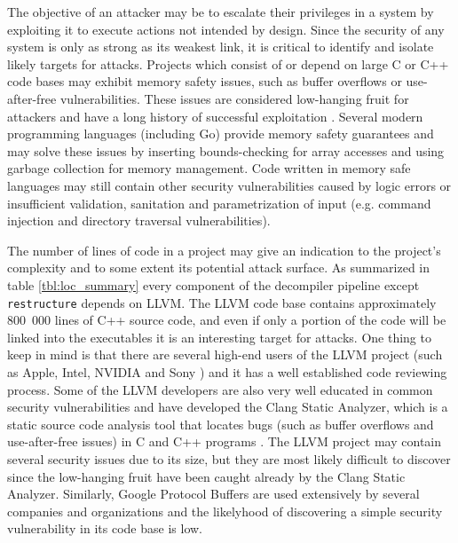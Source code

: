 The objective of an attacker may be to escalate their privileges in a system by exploiting it to execute actions not intended by design. Since the security of any system is only as strong as its weakest link, it is critical to identify and isolate likely targets for attacks. Projects which consist of or depend on large C or C++ code bases may exhibit memory safety issues, such as buffer overflows or use-after-free vulnerabilities. These issues are considered low-hanging fruit for attackers and have a long history of successful exploitation \cite{for_fun_and_profit}. Several modern programming languages (including Go) provide memory safety guarantees and may solve these issues by inserting bounds-checking for array accesses and using garbage collection for memory management. Code written in memory safe languages may still contain other security vulnerabilities caused by logic errors or insufficient validation, sanitation and parametrization of input (e.g. command injection and directory traversal vulnerabilities).

The number of lines of code in a project may give an indication to the project's complexity and to some extent its potential attack surface. As summarized in table \ref{tbl:loc_summary} every component of the decompiler pipeline except \texttt{restructure} depends on LLVM. The LLVM code base contains approximately 800~000 lines of C++ source code, and even if only a portion of the code will be linked into the executables it is an interesting target for attacks. One thing to keep in mind is that there are several high-end users of the LLVM project (such as Apple, Intel, NVIDIA and Sony \cite{llvm_users}) and it has a well established code reviewing process. Some of the LLVM developers are also very well educated in common security vulnerabilities and have developed the Clang Static Analyzer, which is a static source code analysis tool that locates bugs (such as buffer overflows and use-after-free issues) in C and C++ programs \cite{clang_analyzer}. The LLVM project may contain several security issues due to its size, but they are most likely difficult to discover since the low-hanging fruit have been caught already by the Clang Static Analyzer. Similarly, Google Protocol Buffers are used extensively by several companies and organizations and the likelyhood of discovering a simple security vulnerability in its code base is low.

